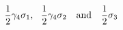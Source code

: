 \begin{equation}
\frac{1}{2} \gamma_{4} \sigma_{1},~~\frac{1}{2} \gamma_{4} \sigma_{2}
~~~{\rm and}~~~\frac{1}{2} \sigma_{3}     \label{eq:hd}
\end{equation}

